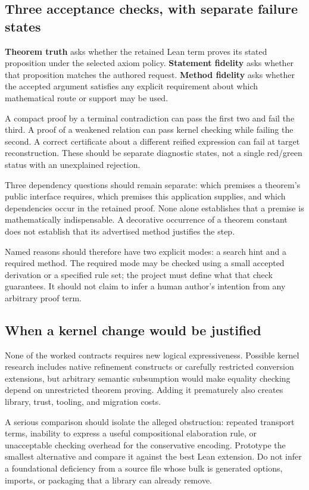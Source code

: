 \documentclass[11pt,letterpaper]{article}
\theoremstyle{definition}\newtheorem{definition}[proposition]{Definition}
\theoremstyle{remark}\newtheorem{remark}[proposition]{Remark}
\begin{document}
\subsection{Three acceptance checks, with separate failure states}
\textbf{Theorem truth} asks whether the retained Lean term proves its stated
proposition under the selected axiom policy. \textbf{Statement fidelity} asks
whether that proposition matches the authored request. \textbf{Method fidelity}
asks whether the accepted argument satisfies any explicit requirement about
which mathematical route or support may be used.

A compact proof by a terminal contradiction can pass the first two and fail
the third. A proof of a weakened relation can pass kernel checking while
failing the second. A correct certificate about a different reified expression
can fail at target reconstruction. These should be separate diagnostic states,
not a single red/green status with an unexplained rejection.

Three dependency questions should remain separate: which premises a theorem's
public interface requires, which premises this application supplies, and which
dependencies occur in the retained proof. None alone establishes that a premise
is mathematically indispensable. A decorative occurrence of a theorem constant
does not establish that its advertised method justifies the step.

Named reasons should therefore have two explicit modes: a search hint and a
required method. The required mode may be checked using a small accepted
derivation or a specified rule set; the project must define what that check
guarantees. It should not claim to infer a human author's intention from any
arbitrary proof term.

\subsection{When a kernel change would be justified}
None of the worked contracts requires new logical expressiveness. Possible
kernel research includes native refinement constructs or carefully restricted
conversion extensions, but arbitrary semantic subsumption would make equality
checking depend on unrestricted theorem proving. Adding it prematurely also
creates library, trust, tooling, and migration costs.

A serious comparison should isolate the alleged obstruction: repeated
transport terms, inability to express a useful compositional elaboration rule,
or unacceptable checking overhead for the conservative encoding. Prototype
the smallest alternative and compare it against the best Lean extension. Do
not infer a foundational deficiency from a source file whose bulk is generated
options, imports, or packaging that a library can already remove.
\end{document}
